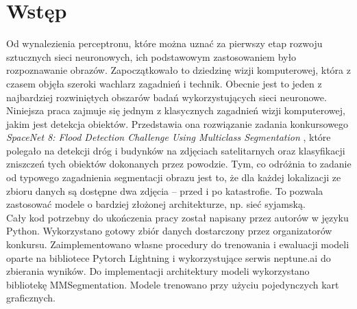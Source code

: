 \newpage %
\section{Wstęp}
Od wynalezienia perceptronu, które można uznać za pierwszy etap rozwoju sztucznych sieci neuronowych, ich podstawowym zastosowaniem było rozpoznawanie obrazów. Zapoczątkowało to dziedzinę wizji komputerowej, która z czasem objęła szeroki wachlarz zagadnień i technik. Obecnie jest to jeden z najbardziej rozwiniętych obszarów badań wykorzystujących sieci neuronowe.\\
Niniejsza praca zajmuje się jednym z klasycznych zagadnień wizji komputerowej, jakim jest detekcja obiektów. Przedstawia ona rozwiązanie zadania konkursowego \textit{SpaceNet 8: Flood Detection Challenge Using Multiclass Segmentation} \cite{spacenet8}, które polegało na detekcji dróg i budynków na zdjęciach satelitarnych oraz klasyfikacji zniszczeń tych obiektów dokonanych przez powodzie. Tym, co odróżnia to zadanie od typowego zagadnienia segmentacji obrazu jest to, że dla każdej lokalizacji ze zbioru danych są dostępne dwa zdjęcia -- przed i po katastrofie. To pozwala zastosować modele o bardziej złożonej architekturze, np. sieć syjamską.\\
Cały kod potrzebny do ukończenia pracy został napisany przez autorów w języku Python. Wykorzystano gotowy zbiór danych dostarczony przez organizatorów konkursu. Zaimplementowano własne procedury do trenowania i ewaluacji modeli oparte na bibliotece Pytorch Lightning i wykorzystujące serwis neptune.ai do zbierania wyników. Do implementacji architektury modeli wykorzystano bibliotekę MMSegmentation. Modele trenowano przy użyciu pojedynczych kart graficznych. 
